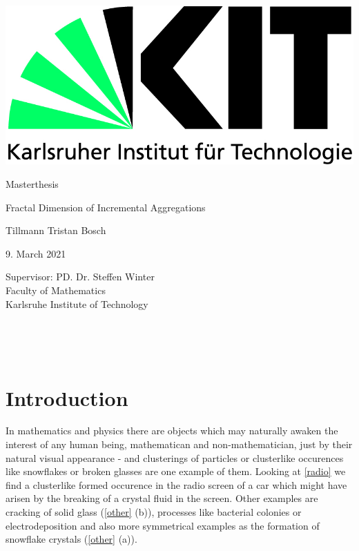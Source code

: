 \documentclass[12pt,a4paper]{scrartcl}
\newcommand{\1}{\mathbbm{1}}
\theoremstyle{definition}
\numberwithin{equation}{section}
\begin{document}
	\pagestyle{empty}

\begin{titlepage}

	\includegraphics[scale=0.45]{images/kit-logo.jpg} 
    \vspace*{2cm} 
\begin{center} \large 
    
   	Masterthesis
    \vspace*{2cm}

    {\huge Fractal Dimension of Incremental Aggregations}\\
    \vspace*{2.5cm}

    Tillmann Tristan Bosch
    \vspace*{1.5cm}

    9. March 2021
    \vspace*{3.5cm}


    Supervisor: PD. Dr. Steffen Winter \\[1cm]
    Faculty of Mathematics\\[1cm]
	Karlsruhe Institute of Technology
\end{center}
\end{titlepage}

\newpage

\newpage
\phantom \\
\newpage

\tableofcontents %

 	\pagestyle{headings}

\setcounter{page}{1}

\newpage
\phantom \\
\newpage

\section{Introduction}
	In mathematics and physics there are objects which may naturally awaken the interest of any human being, mathematican and non-mathematician, just by their natural visual appearance - and clusterings of particles or clusterlike occurences like snowflakes or broken glasses are one example of them. Looking at \autoref{radio} we find a clusterlike formed occurence in the radio screen of a car which might have arisen by the breaking of a crystal fluid in the screen. Other examples are cracking of solid glass (\autoref{other} (b)), processes like bacterial colonies or electrodeposition and also more symmetrical examples as the formation of snowflake crystals (\autoref{other} (a)). \\
	
\end{document}
